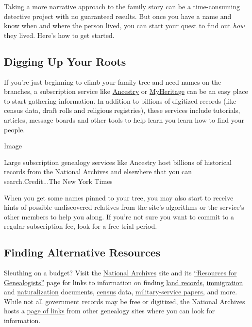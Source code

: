 Taking a more narrative approach to the family story can be a
time-consuming detective project with no guaranteed results. But once
you have a name and know when and where the person lived, you can start
your quest to find out \emph{how} they lived. Here's how to get started.

\hypertarget{digging-up-your-roots}{%
\subsection{Digging Up Your Roots}\label{digging-up-your-roots}}

If you're just beginning to climb your family tree and need names on the
branches, a subscription service like
\href{https://www.ancestry.com/}{Ancestry} or
\href{https://www.myheritage.com}{MyHeritage} can be an easy place to
start gathering information. In addition to billions of digitized
records (like census data, draft rolls and religious registries), these
services include tutorials, articles, message boards and other tools to
help learn you learn how to find your people.

Image

Large subscription genealogy services like Ancestry host billions of
historical records from the National Archives and elsewhere that you can
search.Credit...The New York Times

When you get some names pinned to your tree, you may also start to
receive hints of possible undiscovered relatives from the site's
algorithms or the service's other members to help you along. If you're
not sure you want to commit to a regular subscription fee, look for a
free trial period.

\hypertarget{finding-alternative-resources}{%
\subsection{Finding Alternative
Resources}\label{finding-alternative-resources}}

Sleuthing on a budget? Visit the
\href{https://www.archives.gov}{National Archives} site and its
\href{https://www.archives.gov/research/genealogy}{``Resources for
Genealogists''} page for links to information on finding
\href{https://www.archives.gov/research/land/land-records}{land
records},
\href{https://www.archives.gov/research/immigration}{immigration} and
\href{https://www.archives.gov/research/immigration/naturalization}{naturalization}
documents,
\href{https://www.archives.gov/research/genealogy/census}{census} data,
\href{https://www.archives.gov/veterans}{military-service papers}, and
more. While not all government records may be free or digitized, the
National Archives hosts a
\href{https://www.archives.gov/research/alic/reference/ethnic-heritage.html}{page
of links} from other genealogy sites where you can look for information.

